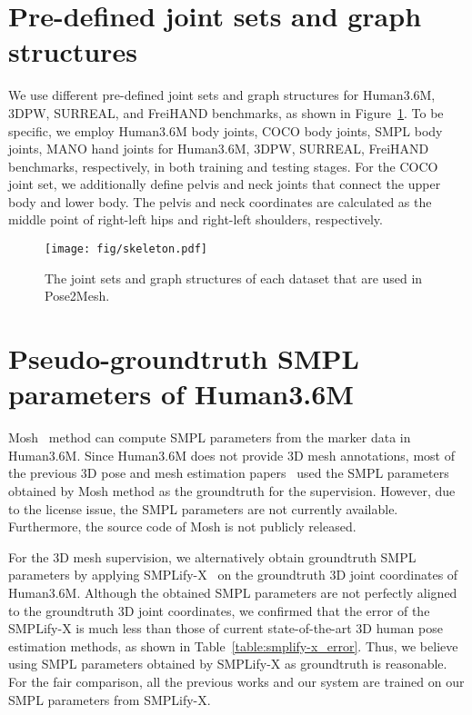 \documentclass[runningheads]{llncs}
\begin{document}
\section{Pre-defined joint sets and graph structures}
We use different pre-defined joint sets and graph structures for Human3.6M, 3DPW, SURREAL, and FreiHAND benchmarks, as shown in Figure~\ref{fig:skeleton}.
To be specific, we employ Human3.6M body joints, COCO body joints, SMPL body joints, MANO hand joints for Human3.6M, 3DPW, SURREAL, FreiHAND benchmarks, respectively, in both training and testing stages.
For the COCO joint set, we additionally define pelvis and neck joints that connect the upper body and lower body.
The pelvis and neck coordinates are calculated as the middle point of right-left hips and right-left shoulders, respectively.

\begin{figure}[!hbt]
\setlength\belowcaptionskip{-2ex}
\centerline{
\texttt{[image: fig/skeleton.pdf]}}
\vspace*{-1mm}
\caption
{
The joint sets and graph structures of each dataset that are used in Pose2Mesh.
}
\label{fig:skeleton}
\end{figure}


\section{Pseudo-groundtruth SMPL parameters of Human3.6M}
Mosh~\cite{loper2014mosh} method can compute SMPL parameters from the marker data in Human3.6M.
Since Human3.6M does not provide 3D mesh annotations, most of the previous 3D pose and mesh estimation papers~\cite{kanazawa2018hmr,pavlakos2018l3d,kolotouros2019cmr,kolotouros2019spin} used the SMPL parameters obtained by Mosh method as the groundtruth for the supervision.
However, due to the license issue, the SMPL parameters are not currently available.
Furthermore, the source code of Mosh is not publicly released.

For the 3D mesh supervision, we alternatively obtain groundtruth SMPL parameters by applying SMPLify-X~\cite{pavlakos2019expressive} on the groundtruth 3D joint coordinates of Human3.6M.
Although the obtained SMPL parameters are not perfectly aligned to the groundtruth 3D joint coordinates, we confirmed that the error of the SMPLify-X is much less than those of current state-of-the-art 3D human pose estimation methods, as shown in Table~\ref{table:smplify-x_error}.
Thus, we believe using SMPL parameters obtained by SMPLify-X as groundtruth is reasonable.
For the fair comparison, all the previous works and our system are trained on our SMPL parameters from SMPLify-X.
\end{document}
